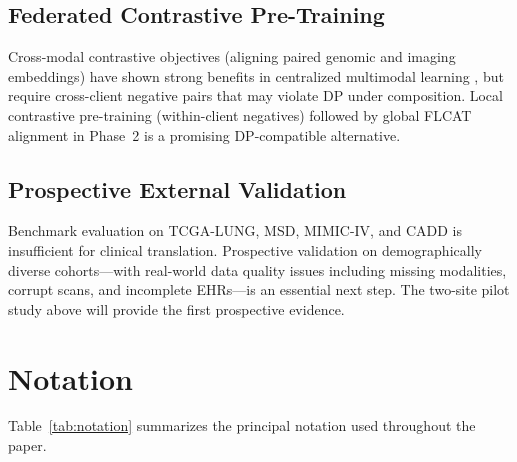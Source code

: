 \documentclass[a4paper,fleqn]{cas-dc}
\begin{document}
\subsection{Federated Contrastive Pre-Training}
Cross-modal contrastive objectives (aligning paired genomic and imaging embeddings) have shown strong benefits in centralized multimodal learning \citep{huang2021multimodal}, but require cross-client negative pairs that may violate DP under composition. Local contrastive pre-training (within-client negatives) followed by global FLCAT alignment in Phase~2 is a promising DP-compatible alternative.

\subsection{Prospective External Validation}
Benchmark evaluation on TCGA-LUNG, MSD, MIMIC-IV, and CADD is insufficient for clinical translation. Prospective validation on demographically diverse cohorts---with real-world data quality issues including missing modalities, corrupt scans, and incomplete EHRs---is an essential next step. The two-site pilot study above will provide the first prospective evidence.

\section{Notation}


Table~\ref{tab:notation} summarizes the principal notation used throughout the paper.
\end{document}
